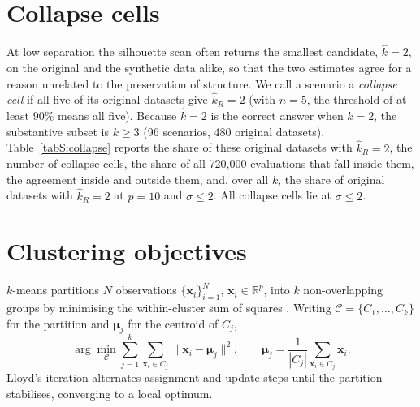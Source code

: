 \documentclass[pdflatex,referee]{sn-jnl}
\newcommand{\bx}{\mathbf{x}}
\newcommand{\bmu}{\boldsymbol{\mu}}
\begin{document}
\section{Collapse cells}
\label{sec:collapse}

At low separation the silhouette scan often returns the smallest candidate,
$\hat{k} = 2$, on the original and the synthetic data alike, so that the two
estimates agree for a reason unrelated to the preservation of structure. We
call a scenario a \emph{collapse cell} if all five of its original datasets
give $\hat{k}_R = 2$ (with $n = 5$, the threshold of at least $90\%$ means all
five). Because $\hat{k} = 2$ is the correct answer when $k = 2$, the
substantive subset is $k \ge 3$ (96 scenarios, 480 original datasets).
Table~\ref{tabS:collapse} reports the share of these original datasets with
$\hat{k}_R = 2$, the number of collapse cells, the share of all 720{,}000
evaluations that fall inside them, the agreement inside and outside them, and,
over all $k$, the share of original datasets with $\hat{k}_R = 2$ at $p = 10$
and $\sigma \le 2$. All collapse cells lie at $\sigma \le 2$.

\begin{table}[!htbp]
\centering
\caption{Collapse cells for $k \ge 3$ under the fixed candidate range
  $\{2,\dots,8\}$ of the main article and under the capped range. Datasets $\hat{k}_R = 2$: share of
  the 480 original datasets with $k \ge 3$ for which the silhouette scan
  selects two groups. Collapse cells: number of the 96 scenarios with $k \ge 3$. Evaluations in
  cells: share of all 720{,}000 evaluations. AG inside and outside: agreement in the evaluations with
  $k \ge 3$ inside and outside the collapse cells. Last column: share of all
  original datasets (all $k$) with $\hat{k}_R = 2$ at $p = 10$ and
  $\sigma \le 2$.}
\label{tabS:collapse}
\small\setlength{\tabcolsep}{4pt}

\end{table}

\section{Clustering objectives}
\label{sec:objectives}

$k$-means partitions $N$ observations $\{\bx_i\}_{i=1}^N$, $\bx_i \in
\mathbb{R}^p$, into $k$ non-overlapping groups by minimising the within-cluster
sum of squares \citep{macqueen1967}. Writing $\mathcal{C} = \{C_1,\dots,C_k\}$
for the partition and $\bmu_j$ for the centroid of $C_j$,
\begin{equation}
  \arg\min_{\mathcal{C}} \sum_{j=1}^{k} \sum_{\bx_i \in C_j}
    \lVert \bx_i - \bmu_j \rVert^2,
  \qquad
  \bmu_j = \frac{1}{|C_j|}\sum_{\bx_i \in C_j} \bx_i .
  \label{eq:wcss}
\end{equation}
Lloyd's iteration alternates assignment and update steps until the partition
stabilises, converging to a local optimum.
\end{document}
